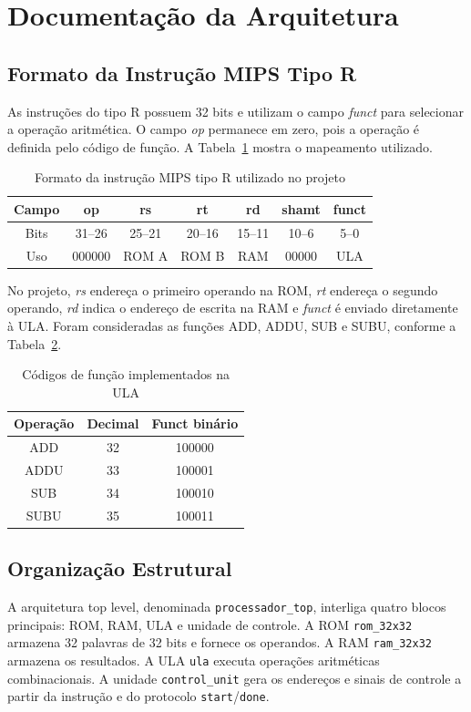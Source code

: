 \documentclass[conference]{IEEEtran}
\begin{document}
\section{Documentação da Arquitetura}

\subsection{Formato da Instrução MIPS Tipo R}
As instruções do tipo R possuem 32 bits e utilizam o campo \textit{funct} para selecionar a operação aritmética. O campo \textit{op} permanece em zero, pois a operação é definida pelo código de função. A Tabela~\ref{tab:rtype} mostra o mapeamento utilizado.

\begin{table}[!t]
\caption{Formato da instrução MIPS tipo R utilizado no projeto}
\label{tab:rtype}
\centering
\begin{tabular}{c c c c c c c}
\toprule
Campo & op & rs & rt & rd & shamt & funct \\
\midrule
Bits & 31--26 & 25--21 & 20--16 & 15--11 & 10--6 & 5--0 \\
Uso & 000000 & ROM A & ROM B & RAM & 00000 & ULA \\
\bottomrule
\end{tabular}
\end{table}

No projeto, \textit{rs} endereça o primeiro operando na ROM, \textit{rt} endereça o segundo operando, \textit{rd} indica o endereço de escrita na RAM e \textit{funct} é enviado diretamente à ULA. Foram consideradas as funções ADD, ADDU, SUB e SUBU, conforme a Tabela~\ref{tab:funct}.

\begin{table}[!t]
\caption{Códigos de função implementados na ULA}
\label{tab:funct}
\centering
\begin{tabular}{c c c}
\toprule
Operação & Decimal & Funct binário \\
\midrule
ADD  & 32 & 100000 \\
ADDU & 33 & 100001 \\
SUB  & 34 & 100010 \\
SUBU & 35 & 100011 \\
\bottomrule
\end{tabular}
\end{table}

\subsection{Organização Estrutural}
A arquitetura top level, denominada \texttt{processador\_top}, interliga quatro blocos principais: ROM, RAM, ULA e unidade de controle. A ROM \texttt{rom\_32x32} armazena 32 palavras de 32 bits e fornece os operandos. A RAM \texttt{ram\_32x32} armazena os resultados. A ULA \texttt{ula} executa operações aritméticas combinacionais. A unidade \texttt{control\_unit} gera os endereços e sinais de controle a partir da instrução e do protocolo \texttt{start}/\texttt{done}.
\end{document}
